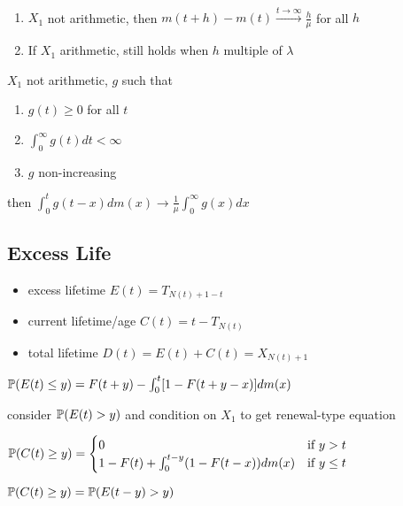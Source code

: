 \begin{thm}\,
    \begin{enumerate}
        \item $X_1$ not arithmetic, then $m(t + h) - m(t) \xrightarrow{t\rightarrow\infty} \frac{h}{\mu}$ for all $h$
        \item If $X_1$ arithmetic, still holds when $h$ multiple of $\lambda$
    \end{enumerate}
\end{thm}

\begin{thm}
    $X_1$ not arithmetic, $g$ such that
    \begin{enumerate}
        \item $g(t) \geq 0$ for all $t$
        \item $\int_0^\infty g(t)dt < \infty$
        \item $g$ non-increasing
    \end{enumerate}
    then $\int_0^t g(t-x) dm(x) \rightarrow \frac{1}{\mu} \int_0^\infty g(x) dx$
\end{thm}

\subsection{Excess Life}\label{subsec:excess-life}

\begin{itemize}
    \item excess lifetime $E(t) = T_{N(t)+1 - t}$
    \item current lifetime/age $C(t) = t - T_{N(t)}$
    \item total lifetime $D(t) = E(t) + C(t) = X_{N(t) + 1}$
\end{itemize}

\begin{thm}
    $\mathbb{P}(E(t) \leq y) = F(t + y) - \int_0^t [1 - F(t + y - x)]dm(x)$
\end{thm}
\begin{pf}
    consider $\mathbb{P}(E(t) > y)$ and condition on $X_1$ to get renewal-type equation
\end{pf}

\begin{cor}
    $\mathbb{P}(C(t) \geq y) =
    \begin{cases}
        0 & \text{if } y > t\\
        1 - F(t) + \int_0^{t-y}(1 - F(t-x))dm(x) &\text{if } y \leq t
    \end{cases}$
\end{cor}
\begin{pf}
    $\mathbb{P}(C(t) \geq y) = \mathbb{P}(E(t -y) > y)$
\end{pf}


